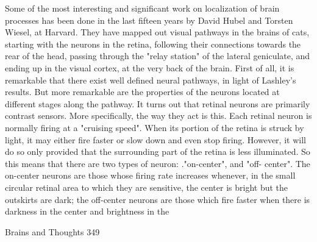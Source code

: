 Some of the most interesting and significant work on localization of brain processes has
been done in the last fifteen years by David Hubel and Torsten Wiesel, at Harvard. They
have mapped out visual pathways in the brains of cats, starting with the neurons in the
retina, following their connections towards the rear of the head, passing through the
"relay station" of the lateral geniculate, and ending up in the visual cortex, at the very
back of the brain. First of all, it is remarkable that there exist well defined neural
pathways, in light of Lashley's results. But more remarkable are the properties of the
neurons located at different stages along the pathway.
  It turns out that retinal neurons are primarily contrast sensors. More specifically, the
way they act is this. Each retinal neuron is normally firing at a "cruising speed". When its
portion of the retina is struck by light, it may either fire faster or slow down and even
stop firing. However, it will do so only provided that the surrounding part of the retina is
less illuminated. So this means that there are two types of neuron: ."on-center", and "off-
center". The on-center neurons are those whose firing rate increases whenever, in the
small circular retinal area to which they are sensitive, the center is bright but the outskirts
are dark; the off-center neurons are those which fire faster when there is darkness in the
center and brightness in the




Brains and Thoughts                                                                        349


